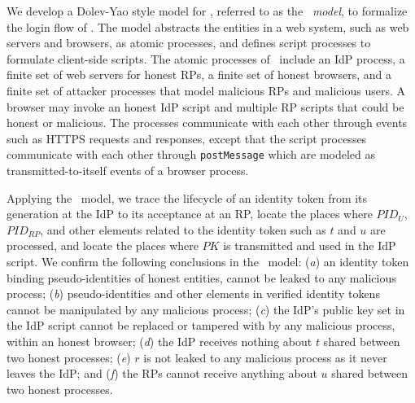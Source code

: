 We develop a Dolev-Yao style model \cite{BrowserID, SPRESSO, FettKS16, FettKS17} for \usso, referred to as the \emph{\dyu\ model}, to formalize the login flow of \usso.
The model abstracts the entities in a web system, such as web servers and browsers, as atomic processes, %
and defines script processes to formulate client-side scripts.
The atomic processes of \usso\ include an IdP process, a finite set of web servers for honest RPs, a finite set of honest browsers, and a finite set of attacker processes that model malicious RPs and malicious users.
A browser may invoke an honest IdP script and multiple RP scripts that could be honest or malicious.
The processes communicate with each other through events such as HTTPS requests and responses,
except that the script processes communicate with each other through \verb+postMessage+ which are modeled as transmitted-to-itself events of a browser process.

\newc
Applying the \dyu\ model, we trace the lifecycle of an identity token from its generation at the IdP to its acceptance at an RP, locate the places where $PID_U$, $PID_{RP}$, and other elements related to the identity token such as $t$ and $u$ are processed, and locate the places where $PK$ is transmitted and used in the IdP script.
We confirm the following conclusions in the \dyu\ model:
(\emph{a}) an identity token binding pseudo-identities of honest entities, cannot be leaked to any malicious process;
(\emph{b}) pseudo-identities and other elements in verified identity tokens cannot be manipulated by any malicious process;
(\emph{c}) the IdP's public key set in the IdP script cannot be replaced or tampered with by any malicious process, within an honest browser;
(\emph{d}) the IdP receives nothing about $t$ shared between two honest processes;
(\emph{e}) $r$ is not leaked to any malicious process as it never leaves the IdP;
and (\emph{f}) the RPs cannot receive anything about $u$ shared between two honest processes.


